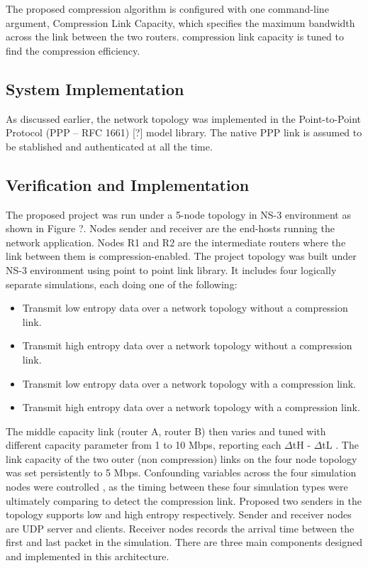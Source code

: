 \documentclass[sigconf]{acmart}
\begin{document}
The proposed compression algorithm is configured with one command-line argument, Compression Link Capacity, which specifies the maximum bandwidth across the link between the two routers. compression link capacity is tuned to find the compression efficiency.

\subsection{System Implementation}
As discussed earlier, the network topology was implemented in the Point-to-Point Protocol (PPP – RFC 1661) [?] model library. The native PPP link is assumed to be stablished and authenticated at all the time. 




\subsection{Verification and Implementation}
The proposed project was run under a 5-node topology in NS-3 environment as shown in Figure ?. Nodes sender and receiver are the end-hosts running the network application. Nodes R1 and R2 are the intermediate routers where the link between them is compression-enabled. The project topology was built under NS-3 environment using point to point link library. It includes four logically separate simulations, each doing one of the following: 
\begin{itemize}
\item Transmit low entropy data over a network topology without a compression link.
\item Transmit high entropy data over a network topology without a compression link. 
\item Transmit low entropy data over a network topology with a compression link. 
\item Transmit high entropy data over a network topology with a compression link.
\end{itemize}

The middle capacity link (router A, router B) then varies and tuned with different capacity parameter from 1 to 10 Mbps, reporting each $\Delta$tH - $\Delta$tL . The link capacity of the two outer (non compression) links on the four node topology was set persistently to 5 Mbps.  Confounding variables across the four simulation nodes were controlled , as the timing between these four simulation types were ultimately comparing to detect the compression link. Proposed two senders in the topology supports low and high entropy respectively. Sender and receiver nodes are UDP server and clients. Receiver nodes records the arrival time between the first and last packet in the simulation. There are three main components designed and implemented in this architecture.  
\end{document}

